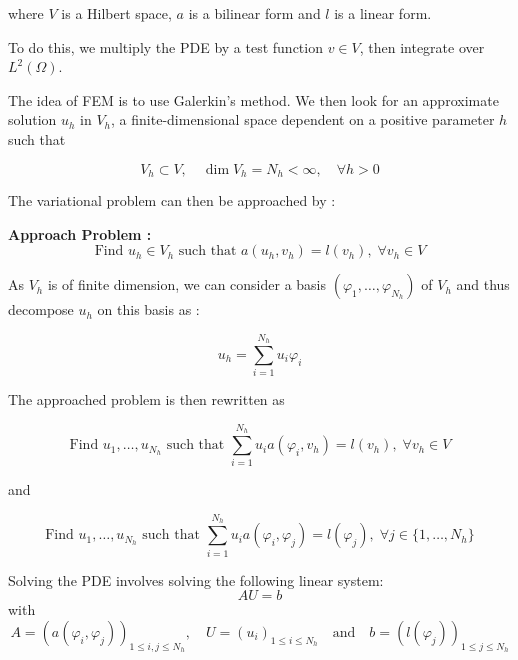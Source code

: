 where $V$ is a Hilbert space, $a$ is a bilinear form and $l$ is a linear form.

To do this, we multiply the PDE by a test function $v\in V$, then integrate over $L^2(\Omega)$.

The idea of FEM is to use Galerkin's method. We then look for an approximate solution $u_h$ in $V_h$, a finite-dimensional space dependent on a positive parameter $h$ such that

\begin{equation*}
	V_h\subset V, \quad \dim V_h = N_h<\infty, \quad \forall h>0
\end{equation*}

The variational problem can then be approached by :

\textbf{Approach Problem :}
\begin{equation*}
	\text{Find } u_h\in V_h \text{ such that } a(u_h,v_h)=l(v_h), \;\forall v_h\in V
\end{equation*}

As $V_h$ is of finite dimension, we can consider a basis $(\varphi_1,\dots,\varphi_{N_h})$ of $V_h$ and thus decompose $u_h$ on this basis as :

\begin{equation}
	\label{decomp1}
	u_h=\sum_{i=1}^{N_h}u_i\varphi_i	
\end{equation}

The approached problem is then rewritten as

\begin{equation*}
	\text{Find } u_1,\dots,u_{N_h} \text{ such that } \sum_{i=1}^{N_h}u_i a(\varphi_i,v_h)=l(v_h), \;\forall v_h\in V 
\end{equation*}

and

\begin{equation*}
	\text{Find } u_1,\dots,u_{N_h} \text{ such that } \sum_{i=1}^{N_h}u_i a(\varphi_i,\varphi_j)=l(\varphi_j), \;\forall j\in \{1,\dots,N_h\}
\end{equation*}

Solving the PDE involves solving the following linear system:
\begin{equation*}
	AU=b
\end{equation*}
with
\begin{equation*}
	A=(a(\varphi_i,\varphi_j))_{1\le i,j\le N_h}, \quad U=(u_i)_{1\le i\le N_h} \quad \text{and} \quad b=(l(\varphi_j))_{1\le j\le N_h}
\end{equation*}

